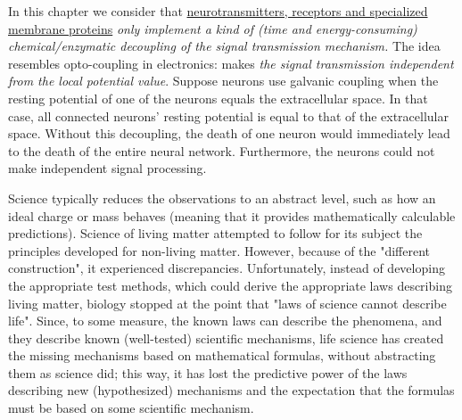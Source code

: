 In this chapter we consider that \href{https://neuronaldynamics.epfl.ch/online/Ch1.S1.html}{neurotransmitters, receptors and specialized membrane proteins}
\textit{only implement a kind of (time and energy-consuming)
	chemical/enzymatic decoupling
	of the signal transmission mechanism.} The idea resembles opto-coupling in electronics:
makes \textit{the signal transmission independent from the local potential value}.
Suppose neurons use galvanic coupling
when the resting potential of one of the neurons equals the extracellular space. In that case,
all connected neurons' resting potential is
equal to that of the extracellular space. Without this decoupling, the death
of one neuron would immediately lead to the death of the entire neural network.
Furthermore, the neurons could not make independent signal processing.

Science typically reduces the observations to an abstract level,
such as how an ideal charge or mass behaves (meaning that it
provides mathematically calculable predictions).
Science of living matter attempted to follow for its subject
the principles developed for non-living matter. However, because of the
"different construction", it experienced discrepancies.
Unfortunately, instead of developing the appropriate
test methods, which could derive the appropriate laws
describing living matter, biology stopped at the point that
"laws of science cannot describe life". 
Since, to some measure, the known laws can describe the phenomena,
and they describe known (well-tested) scientific mechanisms,
life science has created the missing mechanisms based on
mathematical formulas, without abstracting them as science did;
this way, it has lost the predictive power of the laws
describing new (hypothesized) mechanisms
and the expectation that the formulas must be based on some scientific mechanism.


